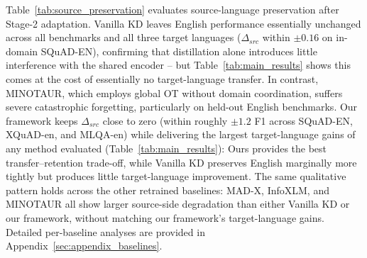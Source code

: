 \documentclass[11pt]{article}
\begin{document}
Table~\ref{tab:source_preservation} evaluates source-language preservation after Stage-2 adaptation. Vanilla KD leaves English performance essentially unchanged across all benchmarks and all three target languages ($\Delta_{src}$ within $\pm0.16$ on in-domain SQuAD-EN), confirming that distillation alone introduces little interference with the shared encoder -- but Table~\ref{tab:main_results} shows this comes at the cost of essentially no target-language transfer. In contrast, MINOTAUR, which employs global OT without domain coordination, suffers severe catastrophic forgetting, particularly on held-out English benchmarks. Our framework keeps $\Delta_{src}$ close to zero (within roughly $\pm1.2$ F1 across SQuAD-EN, XQuAD-en, and MLQA-en) while delivering the largest target-language gains of any method evaluated (Table~\ref{tab:main_results}): Ours provides the best transfer--retention trade-off, while Vanilla KD preserves English marginally more tightly but produces little target-language improvement.
The same qualitative pattern holds across the other retrained baselines: MAD-X, InfoXLM, and MINOTAUR all show larger source-side degradation than either Vanilla KD or our framework, without matching our framework's target-language gains. Detailed per-baseline analyses are provided in Appendix~\ref{sec:appendix_baselines}.
\end{document}
